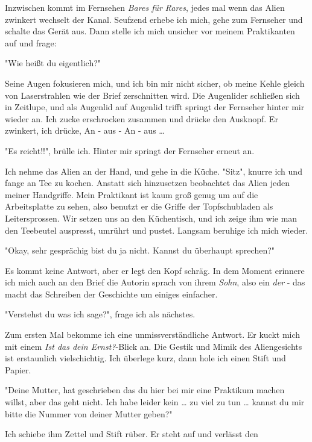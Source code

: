 \documentclass[11pt]{article}
\begin{document}
\noindent Inzwischen kommt im Fernsehen \emph{Bares für Rares}, jedes mal
wenn das Alien zwinkert wechselt der Kanal. Seufzend erhebe ich mich,
gehe zum Fernseher und schalte das Gerät aus. Dann stelle ich mich
unsicher vor meinem Praktikanten auf und frage:
\begin{center}
"Wie heißt du eigentlich?"
\end{center}
Seine Augen fokusieren mich, und ich bin mir nicht sicher, ob meine
Kehle gleich von Laserstrahlen wie der Brief zerschnitten wird. Die 
Augenlider schließen sich in Zeitlupe, und als Augenlid auf
Augenlid trifft springt der Fernseher hinter mir wieder an. Ich zucke
erschrocken zusammen und drücke den Ausknopf. Er zwinkert, ich drücke, 
An - aus - An - aus \ldots{} 
\begin{center}
"Es reicht!!", brülle ich. Hinter mir springt der Fernseher erneut an.
\end{center}
Ich nehme das Alien an der Hand, und gehe in die Küche. "Sitz", knurre
ich und fange an Tee zu kochen. Anstatt sich hinzusetzen beobachtet
das Alien jeden meiner Handgriffe. Mein Praktikant ist kaum groß genug um
auf die Arbeitsplatte zu sehen, also benutzt er die Griffe der
Topfschubladen als Leitersprossen. Wir setzen uns an den Küchentisch,
und ich zeige ihm wie man den Teebeutel auspresst, umrührt und pustet.
Langsam beruhige ich mich wieder.
\begin{center}
"Okay, sehr gesprächig bist du ja nicht. Kannst du überhaupt sprechen?"
\end{center}
Es kommt keine Antwort, aber er legt den Kopf schräg. In dem Moment
erinnere ich mich auch an den Brief die Autorin sprach von ihrem
\emph{Sohn}, also ein \emph{der} - das macht das Schreiben der Geschichte um
einiges einfacher. 
\begin{center}
"Verstehst du was ich sage?", frage ich als nächstes.
\end{center}
Zum ersten Mal bekomme ich eine unmissverständliche Antwort. Er kuckt
mich mit einem \emph{Ist das dein Ernst?}-Blick an. Die Gestik und Mimik
des Aliengesichts ist erstaunlich vielschichtig.
Ich überlege kurz, dann hole ich einen Stift und Papier.
\begin{center}
"Deine Mutter, hat geschrieben das du hier bei mir eine Praktikum
machen willst, aber das geht nicht. Ich habe leider kein \ldots{} zu viel
zu tun \ldots{} kannst du mir bitte die Nummer von deiner Mutter geben?"
\end{center}
Ich schiebe ihm Zettel und Stift rüber. Er steht auf und verlässt den
\end{document}
